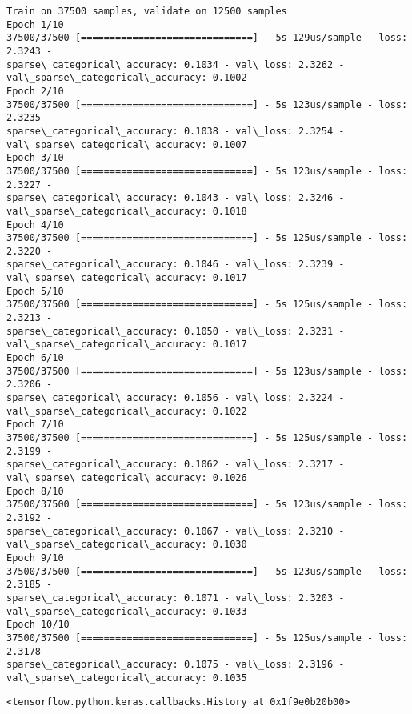 \documentclass[11pt]{article}
\makeatletter
\newcommand{\boxspacing}{\kern\kvtcb@left@rule\kern\kvtcb@boxsep}
\newcommand{\prompt}[4]{
        \ttfamily\llap{{\color{#2}[#3]:\hspace{3pt}#4}}\vspace{-\baselineskip}
    }
\makeatother
\begin{document}
    \begin{Verbatim}[commandchars=\\\{\}]
Train on 37500 samples, validate on 12500 samples
Epoch 1/10
37500/37500 [==============================] - 5s 129us/sample - loss: 2.3243 -
sparse\_categorical\_accuracy: 0.1034 - val\_loss: 2.3262 -
val\_sparse\_categorical\_accuracy: 0.1002
Epoch 2/10
37500/37500 [==============================] - 5s 123us/sample - loss: 2.3235 -
sparse\_categorical\_accuracy: 0.1038 - val\_loss: 2.3254 -
val\_sparse\_categorical\_accuracy: 0.1007
Epoch 3/10
37500/37500 [==============================] - 5s 123us/sample - loss: 2.3227 -
sparse\_categorical\_accuracy: 0.1043 - val\_loss: 2.3246 -
val\_sparse\_categorical\_accuracy: 0.1018
Epoch 4/10
37500/37500 [==============================] - 5s 125us/sample - loss: 2.3220 -
sparse\_categorical\_accuracy: 0.1046 - val\_loss: 2.3239 -
val\_sparse\_categorical\_accuracy: 0.1017
Epoch 5/10
37500/37500 [==============================] - 5s 125us/sample - loss: 2.3213 -
sparse\_categorical\_accuracy: 0.1050 - val\_loss: 2.3231 -
val\_sparse\_categorical\_accuracy: 0.1017
Epoch 6/10
37500/37500 [==============================] - 5s 123us/sample - loss: 2.3206 -
sparse\_categorical\_accuracy: 0.1056 - val\_loss: 2.3224 -
val\_sparse\_categorical\_accuracy: 0.1022
Epoch 7/10
37500/37500 [==============================] - 5s 125us/sample - loss: 2.3199 -
sparse\_categorical\_accuracy: 0.1062 - val\_loss: 2.3217 -
val\_sparse\_categorical\_accuracy: 0.1026
Epoch 8/10
37500/37500 [==============================] - 5s 123us/sample - loss: 2.3192 -
sparse\_categorical\_accuracy: 0.1067 - val\_loss: 2.3210 -
val\_sparse\_categorical\_accuracy: 0.1030
Epoch 9/10
37500/37500 [==============================] - 5s 123us/sample - loss: 2.3185 -
sparse\_categorical\_accuracy: 0.1071 - val\_loss: 2.3203 -
val\_sparse\_categorical\_accuracy: 0.1033
Epoch 10/10
37500/37500 [==============================] - 5s 125us/sample - loss: 2.3178 -
sparse\_categorical\_accuracy: 0.1075 - val\_loss: 2.3196 -
val\_sparse\_categorical\_accuracy: 0.1035
    \end{Verbatim}

            \begin{tcolorbox}[breakable, size=fbox, boxrule=.5pt, pad at break*=1mm, opacityfill=0]
\prompt{Out}{outcolor}{22}{\boxspacing}
\begin{Verbatim}[commandchars=\\\{\}]
<tensorflow.python.keras.callbacks.History at 0x1f9e0b20b00>
\end{Verbatim}
\end{tcolorbox}
        
\end{document}
